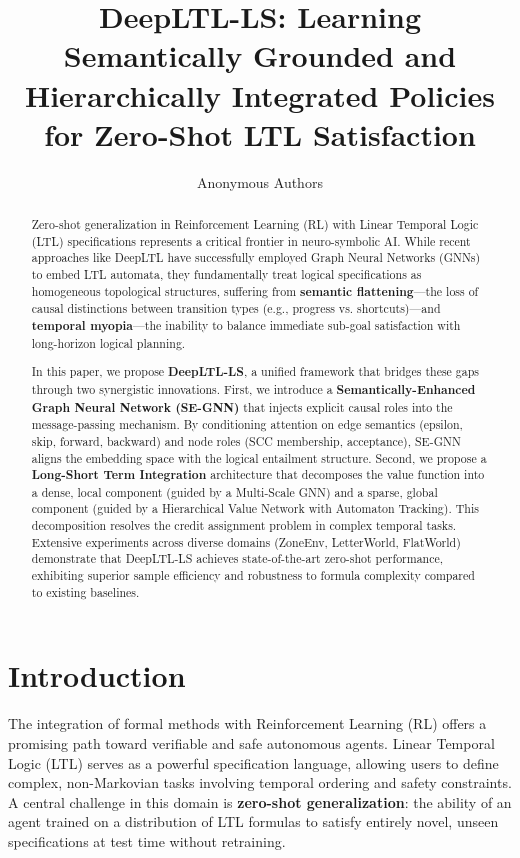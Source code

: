 \documentclass{article}
\title{\textbf{DeepLTL-LS: Learning Semantically Grounded and Hierarchically Integrated Policies for Zero-Shot LTL Satisfaction}}
\author{Anonymous Authors}
\date{}
\begin{document}
\maketitle

\begin{abstract}
Zero-shot generalization in Reinforcement Learning (RL) with Linear Temporal Logic (LTL) specifications represents a critical frontier in neuro-symbolic AI. While recent approaches like DeepLTL have successfully employed Graph Neural Networks (GNNs) to embed LTL automata, they fundamentally treat logical specifications as homogeneous topological structures, suffering from \textbf{semantic flattening}---the loss of causal distinctions between transition types (e.g., progress vs. shortcuts)---and \textbf{temporal myopia}---the inability to balance immediate sub-goal satisfaction with long-horizon logical planning.

In this paper, we propose \textbf{DeepLTL-LS}, a unified framework that bridges these gaps through two synergistic innovations. First, we introduce a \textbf{Semantically-Enhanced Graph Neural Network (SE-GNN)} that injects explicit causal roles into the message-passing mechanism. By conditioning attention on edge semantics (epsilon, skip, forward, backward) and node roles (SCC membership, acceptance), SE-GNN aligns the embedding space with the logical entailment structure. Second, we propose a \textbf{Long-Short Term Integration} architecture that decomposes the value function into a dense, local component (guided by a Multi-Scale GNN) and a sparse, global component (guided by a Hierarchical Value Network with Automaton Tracking). This decomposition resolves the credit assignment problem in complex temporal tasks. Extensive experiments across diverse domains (ZoneEnv, LetterWorld, FlatWorld) demonstrate that DeepLTL-LS achieves state-of-the-art zero-shot performance, exhibiting superior sample efficiency and robustness to formula complexity compared to existing baselines.
\end{abstract}

\section{Introduction}
The integration of formal methods with Reinforcement Learning (RL) offers a promising path toward verifiable and safe autonomous agents. Linear Temporal Logic (LTL) serves as a powerful specification language, allowing users to define complex, non-Markovian tasks involving temporal ordering and safety constraints. A central challenge in this domain is \textbf{zero-shot generalization}: the ability of an agent trained on a distribution of LTL formulas to satisfy entirely novel, unseen specifications at test time without retraining.
\end{document}
